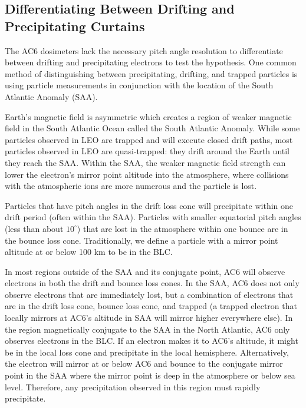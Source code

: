 \documentclass[draft]{agujournal2019}
\begin{document}
\subsection{Differentiating Between Drifting and Precipitating Curtains}

The AC6 dosimeters lack the necessary pitch angle resolution to differentiate between drifting and precipitating electrons to test the  hypothesis. One common method of distinguishing between precipitating, drifting, and trapped particles is using particle measurements in conjunction with the location of the South Atlantic Anomaly (SAA).

Earth's magnetic field is asymmetric which creates a region of weaker magnetic field in the South Atlantic Ocean called the South Atlantic Anomaly. 
While some particles observed in LEO are trapped and will execute closed drift paths, most particles observed in LEO are quasi-trapped: they drift around the Earth until they reach the SAA. Within the SAA, the weaker magnetic field strength can lower the electron's mirror point altitude into the atmosphere, where collisions with the atmospheric ions are more numerous and the particle is lost. 

Particles that have pitch angles in the drift loss cone will precipitate within one drift period (often within the SAA). Particles with smaller equatorial pitch angles (less than about $10^\circ$) that are lost in the atmosphere within one bounce are in the bounce loss cone. Traditionally, we define a particle with a mirror point altitude at or below 100 km to be in the BLC.

In most regions outside of the SAA and its conjugate point, AC6 will observe electrons in both the drift and bounce loss cones. In the SAA, AC6 does not only observe electrons that are immediately lost, but a combination of electrons that are in the drift loss cone, bounce loss cone, and trapped (a trapped electron that locally mirrors at AC6's altitude in SAA will mirror higher everywhere else). In the region magnetically conjugate to the SAA in the North Atlantic, AC6 only observes electrons in the BLC. If an electron makes it to AC6's altitude, it might be in the local loss cone and precipitate in the local hemisphere. Alternatively, the electron will mirror at or below AC6 and bounce to the conjugate mirror point in the SAA where the mirror point is deep in the atmosphere or below sea level. Therefore, any precipitation observed in this region must rapidly precipitate. 
\end{document}
